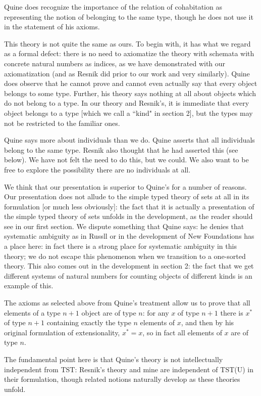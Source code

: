 \documentclass[12pt]{article}
\begin{document}
Quine does recognize the importance of the relation of cohabitation as representing the notion of belonging to the same type, though he does not use it in the statement of his axioms.

This theory is not quite the same as ours.  To begin with, it has what we regard as a formal defect:  there is no need to axiomatize the theory with schemata with concrete natural numbers as indices, as we have demonstrated with our axiomatization (and as Resnik did prior to our work and very similarly).  Quine does observe that he cannot prove and cannot even actually say that every object belongs to some type.  Further, his theory says nothing at all about objects which do not belong to a type. In our theory and Resnik's, it is immediate that every object belongs to a type [which we call a ``kind" in section 2], but the types may not be restricted to the familiar ones.

Quine says more about individuals than we do.  Quine asserts that all individuals belong to the same type.  Resnik also thought that he had asserted this (see below).  We have not felt the need to do this, but we could.  We also want to be free to explore the possibility there are no individuals at all.

We think that our presentation is superior to Quine's for a number of reasons.  Our presentation does not allude to the simple typed theory of sets at all in its formulation [or much less obviously]:  the fact that it is actually a presentation of the simple typed theory of sets unfolds in the development, as the reader should see in our first section.  We dispute something that Quine says:   he denies that systematic ambiguity as in Russll or in the development of New Foundations has a place here:  in fact  there is a strong place for systematic ambiguity in this theory; we do not escape this phenomenon when we transition to a one-sorted theory.  This also comes out in the development in section 2:  the fact that we get different systems of natural numbers for counting objects of different kinds is an example of this.

The axioms as selected above from Quine's treatment allow us to prove that
all elements of a type $n+1$ object are of type $n$:  for any $x$ of type $n+1$ there
is $x^*$ of type $n+1$ containing exactly the type $n$ elements of $x$, and then by his original formulation of extensionality, $x^*=x$, so in fact all elements of $x$ are of type $n$.

The fundamental point here is that Quine's theory is not intellectually independent from TST:  Resnik's theory and mine are independent of TST(U) in their formulation, though related notions naturally develop as these theories unfold.
\end{document}
